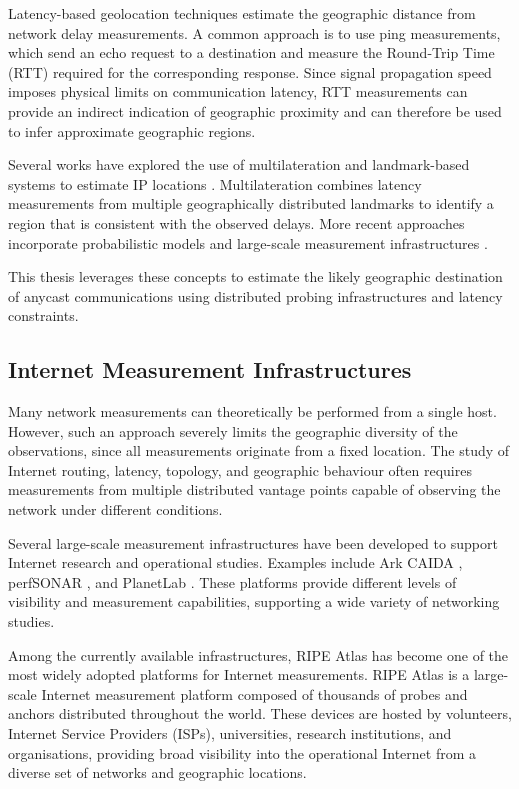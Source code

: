 \documentclass[
A4paper,                %
twoside,                %
openright,              %
chapterprefix=true,     %
12pt,                   %
headings=normal,        %
titlepage=on            %
]{book}
\begin{document}
Latency-based geolocation techniques estimate the geographic distance from network delay measurements. A common approach is to use ping measurements, which send an echo request to a destination and measure the Round-Trip Time (RTT) required for the corresponding response. Since signal propagation speed imposes physical limits on communication latency, RTT measurements can provide an indirect indication of geographic proximity and can therefore be used to infer approximate geographic regions.

Several works have explored the use of multilateration and landmark-based systems to estimate IP locations \cite{Cicalese2015AGeolocation, Cicalese2016Latency-BasedSets}. Multilateration combines latency measurements from multiple geographically distributed landmarks to identify a region that is consistent with the observed delays. More recent approaches incorporate probabilistic models and large-scale measurement infrastructures \cite{Kohls2022VerLoc:Systems, Sommese2020MAnycast2:Anycast}.

This thesis leverages these concepts to estimate the likely geographic destination of anycast communications using distributed probing infrastructures and latency constraints.

\subsection{Internet Measurement Infrastructures}
\label{sc:background_location_measurements_infraestructures}

Many network measurements can theoretically be performed from a single host. However, such an approach severely limits the geographic diversity of the observations, since all measurements originate from a fixed location. The study of Internet routing, latency, topology, and geographic behaviour often requires measurements from multiple distributed vantage points capable of observing the network under different conditions.

Several large-scale measurement infrastructures have been developed to support Internet research and operational studies. Examples include Ark CAIDA \cite{ArkCAIDA}, perfSONAR \cite{PerfSONAR}, and PlanetLab \cite{HomePlanetLab}. These platforms provide different levels of visibility and measurement capabilities, supporting a wide variety of networking studies.

Among the currently available infrastructures, RIPE Atlas \cite{HomeAtlas} has become one of the most widely adopted platforms for Internet measurements. RIPE Atlas is a large-scale Internet measurement platform composed of thousands of probes and anchors distributed throughout the world. These devices are hosted by volunteers, Internet Service Providers (ISPs), universities, research institutions, and organisations, providing broad visibility into the operational Internet from a diverse set of networks and geographic locations.
\end{document}
